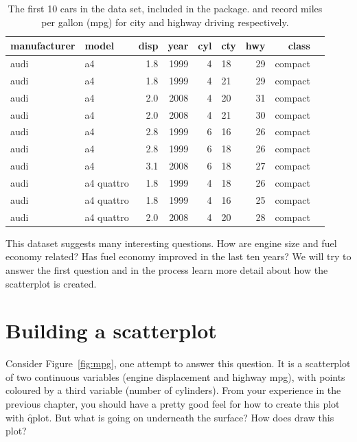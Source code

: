 \begin{table}
  \begin{center}
  \begin{tabular}{llrrrlrrl}
    \toprule
    manufacturer & model & disp & year & cyl & cty & hwy & class \\
    \midrule
    audi & a4         & 1.8 & 1999 & 4 & 18 & 29 & compact\\
    audi & a4         & 1.8 & 1999 & 4 & 21 & 29 & compact\\
    audi & a4         & 2.0 & 2008 & 4 & 20 & 31 & compact\\
    audi & a4         & 2.0 & 2008 & 4 & 21 & 30 & compact\\
    audi & a4         & 2.8 & 1999 & 6 & 16 & 26 & compact\\
    audi & a4         & 2.8 & 1999 & 6 & 18 & 26 & compact\\
    audi & a4         & 3.1 & 2008 & 6 & 18 & 27 & compact\\
    audi & a4 quattro & 1.8 & 1999 & 4 & 18 & 26 & compact\\
    audi & a4 quattro & 1.8 & 1999 & 4 & 16 & 25 & compact\\
    audi & a4 quattro & 2.0 & 2008 & 4 & 20 & 28 & compact\\
        \bottomrule
  \end{tabular}
  \end{center}
  \caption{The first 10 cars in the  data set, included in the \ggplot package.   and  record miles per gallon (mpg) for city and highway driving respectively.  }
  \label{tbl:mpg}
\end{table}

This dataset suggests many interesting questions.  How are engine size and fuel economy related?  Has fuel economy improved in the last ten years?  We will try to answer the first question and in the process learn more detail about how the scatterplot is created.

\section{Building a scatterplot}
\label{sec:simple-plot}

Consider Figure~\ref{fig:mpg}, one attempt to answer this question.  It is a scatterplot of two continuous variables (engine displacement and highway mpg), with points coloured by a third variable (number of cylinders).  From your experience in the previous chapter, you should have a pretty good feel for how to create this plot with \f{qplot}.  But what is going on underneath the surface?  How does \ggplot draw this plot?

